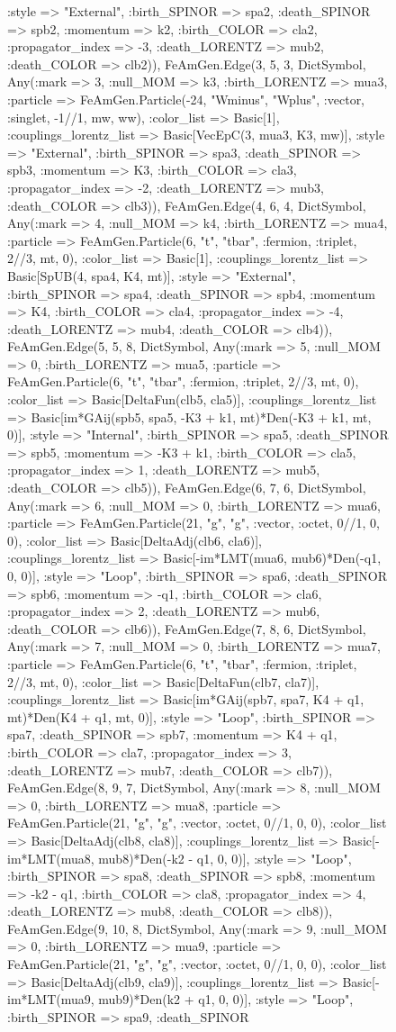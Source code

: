 \documentclass{revtex4}
\begin{document}
\begin{figure}[!htb]
\begin{center}
{:style => "External", :birth_SPINOR => spa2, :death_SPINOR => spb2, :momentum => k2, :birth_COLOR => cla2, :propagator_index => -3, :death_LORENTZ => mub2, :death_COLOR => clb2)), FeAmGen.Edge(3, 5, 3, Dict{Symbol, Any}(:mark => 3, :null_MOM => k3, :birth_LORENTZ => mua3, :particle => FeAmGen.Particle(-24, "Wminus", "Wplus", :vector, :singlet, -1//1, mw, ww), :color_list => Basic[1], :couplings_lorentz_list => Basic[VecEpC(3, mua3, K3, mw)], :style => "External", :birth_SPINOR => spa3, :death_SPINOR => spb3, :momentum => K3, :birth_COLOR => cla3, :propagator_index => -2, :death_LORENTZ => mub3, :death_COLOR => clb3)), FeAmGen.Edge(4, 6, 4, Dict{Symbol, Any}(:mark => 4, :null_MOM => k4, :birth_LORENTZ => mua4, :particle => FeAmGen.Particle(6, "t", "tbar", :fermion, :triplet, 2//3, mt, 0), :color_list => Basic[1], :couplings_lorentz_list => Basic[SpUB(4, spa4, K4, mt)], :style => "External", :birth_SPINOR => spa4, :death_SPINOR => spb4, :momentum => K4, :birth_COLOR => cla4, :propagator_index => -4, :death_LORENTZ => mub4, :death_COLOR => clb4)), FeAmGen.Edge(5, 5, 8, Dict{Symbol, Any}(:mark => 5, :null_MOM => 0, :birth_LORENTZ => mua5, :particle => FeAmGen.Particle(6, "t", "tbar", :fermion, :triplet, 2//3, mt, 0), :color_list => Basic[DeltaFun(clb5, cla5)], :couplings_lorentz_list => Basic[im*GAij(spb5, spa5, -K3 + k1, mt)*Den(-K3 + k1, mt, 0)], :style => "Internal", :birth_SPINOR => spa5, :death_SPINOR => spb5, :momentum => -K3 + k1, :birth_COLOR => cla5, :propagator_index => 1, :death_LORENTZ => mub5, :death_COLOR => clb5)), FeAmGen.Edge(6, 7, 6, Dict{Symbol, Any}(:mark => 6, :null_MOM => 0, :birth_LORENTZ => mua6, :particle => FeAmGen.Particle(21, "g", "g", :vector, :octet, 0//1, 0, 0), :color_list => Basic[DeltaAdj(clb6, cla6)], :couplings_lorentz_list => Basic[-im*LMT(mua6, mub6)*Den(-q1, 0, 0)], :style => "Loop", :birth_SPINOR => spa6, :death_SPINOR => spb6, :momentum => -q1, :birth_COLOR => cla6, :propagator_index => 2, :death_LORENTZ => mub6, :death_COLOR => clb6)), FeAmGen.Edge(7, 8, 6, Dict{Symbol, Any}(:mark => 7, :null_MOM => 0, :birth_LORENTZ => mua7, :particle => FeAmGen.Particle(6, "t", "tbar", :fermion, :triplet, 2//3, mt, 0), :color_list => Basic[DeltaFun(clb7, cla7)], :couplings_lorentz_list => Basic[im*GAij(spb7, spa7, K4 + q1, mt)*Den(K4 + q1, mt, 0)], :style => "Loop", :birth_SPINOR => spa7, :death_SPINOR => spb7, :momentum => K4 + q1, :birth_COLOR => cla7, :propagator_index => 3, :death_LORENTZ => mub7, :death_COLOR => clb7)), FeAmGen.Edge(8, 9, 7, Dict{Symbol, Any}(:mark => 8, :null_MOM => 0, :birth_LORENTZ => mua8, :particle => FeAmGen.Particle(21, "g", "g", :vector, :octet, 0//1, 0, 0), :color_list => Basic[DeltaAdj(clb8, cla8)], :couplings_lorentz_list => Basic[-im*LMT(mua8, mub8)*Den(-k2 - q1, 0, 0)], :style => "Loop", :birth_SPINOR => spa8, :death_SPINOR => spb8, :momentum => -k2 - q1, :birth_COLOR => cla8, :propagator_index => 4, :death_LORENTZ => mub8, :death_COLOR => clb8)), FeAmGen.Edge(9, 10, 8, Dict{Symbol, Any}(:mark => 9, :null_MOM => 0, :birth_LORENTZ => mua9, :particle => FeAmGen.Particle(21, "g", "g", :vector, :octet, 0//1, 0, 0), :color_list => Basic[DeltaAdj(clb9, cla9)], :couplings_lorentz_list => Basic[-im*LMT(mua9, mub9)*Den(k2 + q1, 0, 0)], :style => "Loop", :birth_SPINOR => spa9, :death_SPINOR }
\end{center}
\end{figure}
\end{document}
